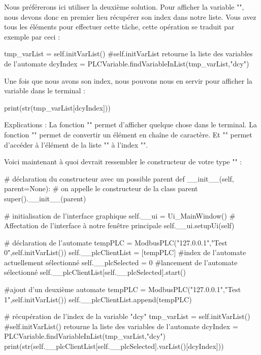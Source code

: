 Nous préférerons ici utiliser la deuxième solution. Pour afficher la variable "", nous devons donc en premier lieu récupérer son index dans notre liste. Vous avez tous les éléments pour effectuer cette tâche, cette opération se traduit par exemple par ceci :
\begin{pyCode}
tmp_varList = self.initVarList()
#self.initVarList retourne la liste des variables de l'automate
dcyIndex = PLCVariable.findVariableInList(tmp_varList,"dcy")
\end{pyCode}
Une fois que nous avons son index, nous pouvons nous en servir pour afficher la variable dans le terminal :
\begin{pyCode}
print(str(tmp_varList[dcyIndex]))
\end{pyCode}
Explications :\newline
La fonction "" permet d'afficher quelque chose dans le terminal.\newline
La fonction "" permet de convertir un élément en chaîne de caractère.\newline
Et "" permet d'accéder à l'élément de la liste "" à l'index "".\smallSkip








Voici maintenant à quoi devrait ressembler le constructeur de votre type "" :
\begin{pyCode}

	# déclaration du constructeur avec un possible parent
	def __init__(self, parent=None):
        # on appelle le constructeur de la class parent
        super().__init__(parent)

        # initialisation de l’interface graphique
        self.__ui = Ui_MainWindow()
        # Affectation de l’interface à notre fenêtre principale
        self.__ui.setupUi(self)

        # déclaration de l’automate
        tempPLC = ModbusPLC("127.0.0.1","Test 0",self.initVarList())
        self.__plcClientList = [tempPLC]    
		#index de l'automate actuellement sélectionné
        self.__plcSelected = 0
        #lancement de l'automate sélectionné
        self.__plcClientList[self.__plcSelected].start()

        #ajout d'un deuxième automate
        tempPLC = ModbusPLC("127.0.0.1","Test 1",self.initVarList())
        self.__plcClientList.append(tempPLC)

        # récupération de l’index de la variable "dcy"
        tmp_varList = self.initVarList()
        #self.initVarList() retourne la liste des variables de l'automate
        dcyIndex = PLCVariable.findVariableInList(tmp_varList,"dcy")
        print(str(self.__plcClientList[self.__plcSelected].varList()[dcyIndex]))

\end{pyCode}
\smallSkip

